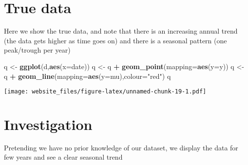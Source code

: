 \documentclass[]{book}
\newenvironment{Shaded}{\begin{snugshade}}{\end{snugshade}}
\newcommand{\KeywordTok}[1]{\textcolor[rgb]{0.13,0.29,0.53}{\textbf{#1}}}
\newcommand{\DataTypeTok}[1]{\textcolor[rgb]{0.13,0.29,0.53}{#1}}
\newcommand{\DecValTok}[1]{\textcolor[rgb]{0.00,0.00,0.81}{#1}}
\newcommand{\StringTok}[1]{\textcolor[rgb]{0.31,0.60,0.02}{#1}}
\newcommand{\OperatorTok}[1]{\textcolor[rgb]{0.81,0.36,0.00}{\textbf{#1}}}
\newcommand{\NormalTok}[1]{#1}
\begin{document}
\newpage

\section{True data}\label{true-data}

Here we show the true data, and note that there is an increasing annual
trend (the data gets higher as time goes on) and there is a seasonal
pattern (one peak/trough per year)

\begin{Shaded}
\begin{Highlighting}[]
\NormalTok{q <-}\StringTok{ }\KeywordTok{ggplot}\NormalTok{(d,}\KeywordTok{aes}\NormalTok{(}\DataTypeTok{x=}\NormalTok{date))}
\NormalTok{q <-}\StringTok{ }\NormalTok{q }\OperatorTok{+}\StringTok{ }\KeywordTok{geom_point}\NormalTok{(}\DataTypeTok{mapping=}\KeywordTok{aes}\NormalTok{(}\DataTypeTok{y=}\NormalTok{y))}
\NormalTok{q <-}\StringTok{ }\NormalTok{q }\OperatorTok{+}\StringTok{ }\KeywordTok{geom_line}\NormalTok{(}\DataTypeTok{mapping=}\KeywordTok{aes}\NormalTok{(}\DataTypeTok{y=}\NormalTok{mu),}\DataTypeTok{colour=}\StringTok{"red"}\NormalTok{)}
\NormalTok{q}
\end{Highlighting}
\end{Shaded}

\texttt{[image: website\_files/figure-latex/unnamed-chunk-19-1.pdf]}

\newpage

\section{Investigation}\label{investigation}

Pretending we have no prior knowledge of our dataset, we display the
data for few years and see a clear seasonal trend

\begin{Shaded}
\end{Shaded}
\end{document}

